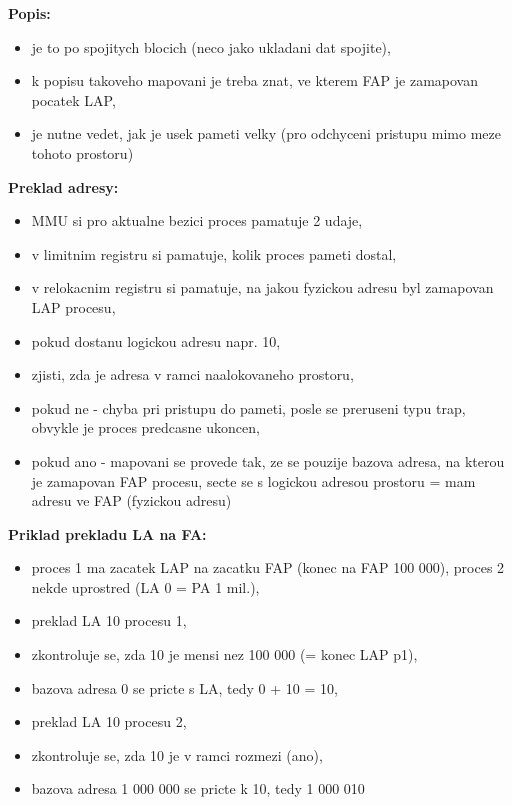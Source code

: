 \documentclass[a4paper, 11pt]{article}
\begin{document}
\textbf{Popis:}
\begin{itemize}
    \item je to po spojitych blocich (neco jako ukladani dat spojite),
    \item k popisu takoveho mapovani je treba znat, ve kterem FAP je zamapovan pocatek LAP,
    \item je nutne vedet, jak je usek pameti velky (pro odchyceni pristupu mimo meze tohoto prostoru) \\
\end{itemize}

\textbf{Preklad adresy:}
\begin{itemize}
    \item MMU si pro aktualne bezici proces pamatuje 2 udaje,
    \item v limitnim registru si pamatuje, kolik proces pameti dostal,
    \item v relokacnim registru si pamatuje, na jakou fyzickou adresu byl zamapovan LAP procesu,
    \item pokud dostanu logickou adresu napr. 10, 
    \item zjisti, zda je adresa v ramci naalokovaneho prostoru,
    \item pokud ne - chyba pri pristupu do pameti, posle se preruseni typu trap, obvykle je proces predcasne ukoncen,
    \item pokud ano - mapovani se provede tak, ze se pouzije bazova adresa, na kterou je zamapovan FAP procesu, secte se s logickou adresou prostoru = mam adresu ve FAP (fyzickou adresu) \\
\end{itemize}

\textbf{Priklad prekladu LA na FA:}
\begin{itemize}
    \item proces 1 ma zacatek LAP na zacatku FAP (konec na FAP 100 000), proces 2 nekde uprostred (LA 0 = PA 1 mil.),
    \item preklad LA 10 procesu 1,
    \item zkontroluje se, zda 10 je mensi nez 100 000 (= konec LAP p1),
    \item bazova adresa 0 se pricte s LA, tedy 0 + 10 = 10,
    \item preklad LA 10 procesu 2,
    \item zkontroluje se, zda 10 je v ramci rozmezi (ano),
    \item bazova adresa 1 000 000 se pricte k 10, tedy 1 000 010 \\
\end{itemize}
\end{document}
